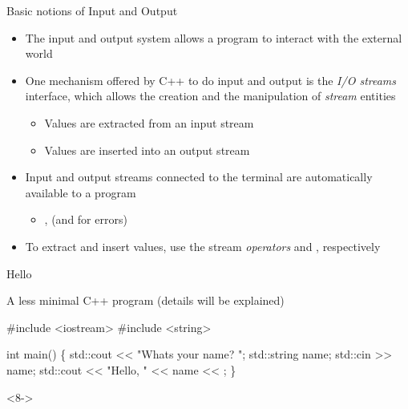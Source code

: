 \begin{frame}[fragile]{Basic notions of Input and Output}

  \begin{itemize}
  \item The input and output system allows a program to interact with the
    external world
  \item One mechanism offered by C++ to do input and output is the \textit{I/O
      streams} interface, which allows the creation and the manipulation of
    \textit{stream} entities
    \begin{itemize}
    \item Values are extracted from an input stream
    \item Values are inserted into an output stream
    \end{itemize}
  \item Input and output streams connected to the terminal are automatically
    available to a program
    \begin{itemize}
    \item {},  (and  for errors)
    \end{itemize}
  \item To extract and insert values, use the stream \textit{operators}
    \code{>>} and \code{<<}, respectively
  \end{itemize}

\end{frame}

\begin{frame}[fragile]{Hello}

  A less minimal C++ program (details will be explained)

  \begin{codeblock}
\alert<2>{#include <iostream>}
\alert<2>{#include <string>}

int \alert<3>{main}()
\{
\alert<4>{  std::cout <{}< "What\textquotesingle{}s your name? ";}
\alert<5>{  std::string name;}
\alert<6>{  std::cin >{}> name;}
\alert<7>{  std::cout <{}< "Hello, " <{}< name <{}< \bslashn{};}
\}\end{codeblock}

\begin{shellblock}<8->{
}\end{shellblock}

\end{frame}

